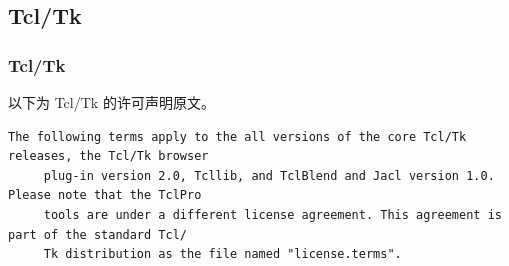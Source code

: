 \subsection{Tcl/Tk}
\subsubsection*{Tcl/Tk}

以下为 Tcl/Tk 的许可声明原文。

\begin{lstlisting}[basicstyle=\ttfamily\footnotesize,breaklines=true]
     The following terms apply to the all versions of the core Tcl/Tk releases, the Tcl/Tk browser
     plug-in version 2.0, Tcllib, and TclBlend and Jacl version 1.0. Please note that the TclPro
     tools are under a different license agreement. This agreement is part of the standard Tcl/
     Tk distribution as the file named "license.terms".





\end{lstlisting}
